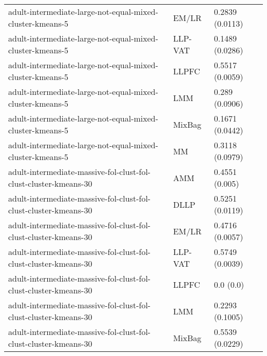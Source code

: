 \begin{longtable}{lll}
                                                    adult-intermediate-large-not-equal-mixed-cluster-kmeans-5 &     EM/LR &                           0.2839 (0.0113) \\
                                                    adult-intermediate-large-not-equal-mixed-cluster-kmeans-5 &   LLP-VAT &                           0.1489 (0.0286) \\
                                                    adult-intermediate-large-not-equal-mixed-cluster-kmeans-5 &     LLPFC &                           0.5517 (0.0059) \\
                                                    adult-intermediate-large-not-equal-mixed-cluster-kmeans-5 &       LMM &                            0.289 (0.0906) \\
                                                    adult-intermediate-large-not-equal-mixed-cluster-kmeans-5 &    MixBag &                           0.1671 (0.0442) \\
                                                    adult-intermediate-large-not-equal-mixed-cluster-kmeans-5 &        MM &                           0.3118 (0.0979) \\
                                             adult-intermediate-massive-fol-clust-fol-clust-cluster-kmeans-30 &       AMM &                            0.4551 (0.005) \\
                                             adult-intermediate-massive-fol-clust-fol-clust-cluster-kmeans-30 &      DLLP &                           0.5251 (0.0119) \\
                                             adult-intermediate-massive-fol-clust-fol-clust-cluster-kmeans-30 &     EM/LR &                           0.4716 (0.0057) \\
                                             adult-intermediate-massive-fol-clust-fol-clust-cluster-kmeans-30 &   LLP-VAT &                           0.5749 (0.0039) \\
                                             adult-intermediate-massive-fol-clust-fol-clust-cluster-kmeans-30 &     LLPFC &                                 0.0 (0.0) \\
                                             adult-intermediate-massive-fol-clust-fol-clust-cluster-kmeans-30 &       LMM &                           0.2293 (0.1005) \\
                                             adult-intermediate-massive-fol-clust-fol-clust-cluster-kmeans-30 &    MixBag &                           0.5539 (0.0229) \\

\end{longtable}
